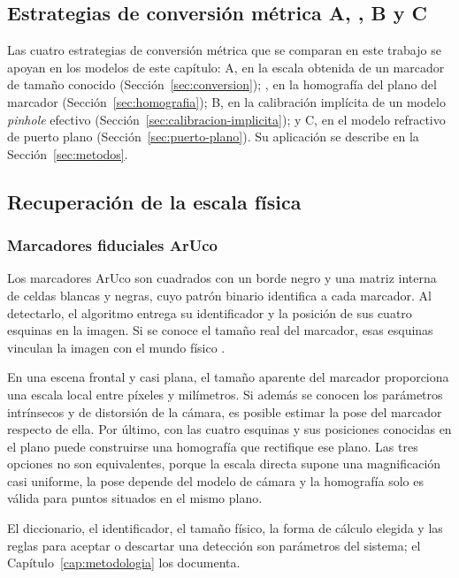 \subsection{Estrategias de conversión métrica A, \Aprime, B y C}

Las cuatro estrategias de conversión métrica que se comparan en este trabajo se apoyan en los modelos de este capítulo: A, en la escala obtenida de un marcador de tamaño conocido (Sección~\ref{sec:conversion}); \Aprime, en la homografía del plano del marcador (Sección~\ref{sec:homografia}); B, en la calibración implícita de un modelo \emph{pinhole} efectivo (Sección~\ref{sec:calibracion-implicita}); y C, en el modelo refractivo de puerto plano (Sección~\ref{sec:puerto-plano}). Su aplicación se describe en la Sección~\ref{sec:metodos}.

\subsection{Recuperación de la escala física}

\subsubsection{Marcadores fiduciales ArUco}

Los marcadores ArUco son cuadrados con un borde negro y una matriz interna de celdas blancas y negras, cuyo patrón binario identifica a cada marcador. Al detectarlo, el algoritmo entrega su identificador y la posición de sus cuatro esquinas en la imagen. Si se conoce el tamaño real del marcador, esas esquinas vinculan la imagen con el mundo físico \parencite{GarridoJurado2014}.

En una escena frontal y casi plana, el tamaño aparente del marcador proporciona una escala local entre píxeles y milímetros. Si además se conocen los parámetros intrínsecos y de distorsión de la cámara, es posible estimar la pose del marcador respecto de ella. Por último, con las cuatro esquinas y sus posiciones conocidas en el plano puede construirse una homografía que rectifique ese plano. Las tres opciones no son equivalentes, porque la escala directa supone una magnificación casi uniforme, la pose depende del modelo de cámara y la homografía solo es válida para puntos situados en el mismo plano.

El diccionario, el identificador, el tamaño físico, la forma de cálculo elegida y las reglas para aceptar o descartar una detección son parámetros del sistema; el Capítulo~\ref{cap:metodologia} los documenta.

